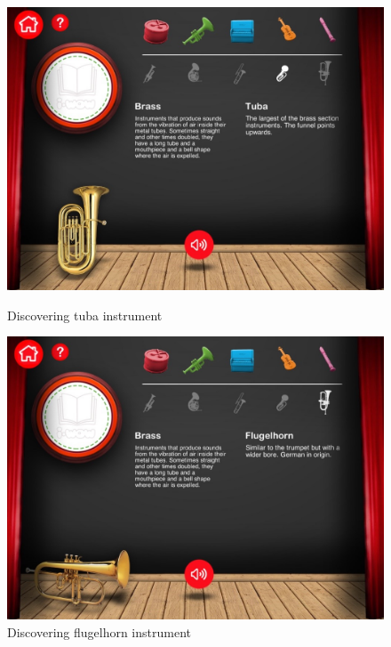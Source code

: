 \begin{figure}[ht!]
  \centering
  \includegraphics[width=350pt]{graphics/additional-screens/discovering_brass_tuba_screen.jpg}
  \vspace{0.05cm}
  \caption{Discovering tuba instrument}
  \vspace{0.6cm}

  \includegraphics[width=350pt]{graphics/additional-screens/discovering_brass_flugelhorn_screen.jpg}
  \vspace{0.05cm}
  \caption{Discovering flugelhorn instrument}
\end{figure}

